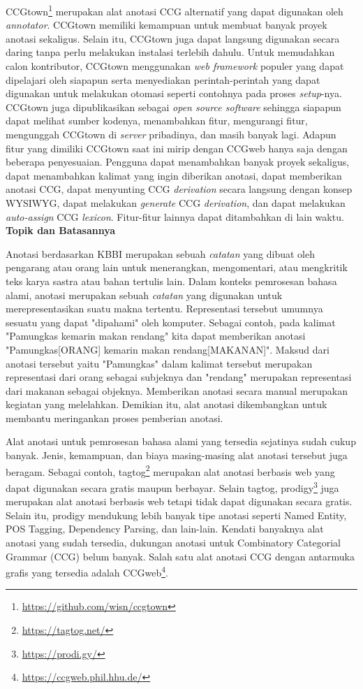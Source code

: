 CCGtown\footnote{\url{https://github.com/wisn/ccgtown}} merupakan alat anotasi CCG alternatif yang
dapat digunakan oleh \textit{annotator}. CCGtown memiliki kemampuan untuk membuat banyak proyek
anotasi sekaligus. Selain itu, CCGtown juga dapat langsung digunakan secara daring tanpa perlu
melakukan instalasi terlebih dahulu. Untuk memudahkan calon kontributor, CCGtown menggunakan
\textit{web framework} populer yang dapat dipelajari oleh siapapun serta menyediakan
perintah-perintah yang dapat digunakan untuk melakukan otomasi seperti contohnya pada proses
\textit{setup}-nya. CCGtown juga dipublikasikan sebagai \textit{open source software} sehingga
siapapun dapat melihat sumber kodenya, menambahkan fitur, mengurangi fitur, mengunggah CCGtown di
\textit{server} pribadinya, dan masih banyak lagi. Adapun fitur yang dimiliki CCGtown saat ini
mirip dengan CCGweb hanya saja dengan beberapa penyesuaian. Pengguna dapat menambahkan banyak
proyek sekaligus, dapat menambahkan kalimat yang ingin diberikan anotasi, dapat memberikan anotasi
CCG, dapat menyunting CCG \textit{derivation} secara langsung dengan konsep WYSIWYG, dapat
melakukan \textit{generate} CCG \textit{derivation}, dan dapat melakukan \textit{auto-assign} CCG
\textit{lexicon}. Fitur-fitur lainnya dapat ditambahkan di lain waktu.
\\


\noindent\textbf{Topik dan Batasannya}

Anotasi berdasarkan KBBI merupakan sebuah \textit{catatan} yang dibuat oleh pengarang atau
orang lain untuk menerangkan, mengomentari, atau mengkritik teks karya sastra atau
bahan tertulis lain. Dalam konteks pemrosesan bahasa alami, anotasi merupakan sebuah
\textit{catatan} yang digunakan untuk merepresentasikan suatu makna tertentu.
Representasi tersebut umumnya sesuatu yang dapat "dipahami" oleh komputer.
Sebagai contoh, pada kalimat "Pamungkas kemarin makan rendang" kita dapat memberikan anotasi
"Pamungkas[ORANG] kemarin makan rendang[MAKANAN]". Maksud dari anotasi tersebut yaitu "Pamungkas"
dalam kalimat tersebut merupakan representasi dari orang sebagai subjeknya dan "rendang"
merupakan representasi dari makanan sebagai objeknya. Memberikan anotasi secara manual merupakan
kegiatan yang melelahkan. Demikian itu, alat anotasi dikembangkan untuk membantu meringankan
proses pemberian anotasi.

Alat anotasi untuk pemrosesan bahasa alami yang tersedia sejatinya sudah cukup banyak.
Jenis, kemampuan, dan biaya masing-masing alat anotasi tersebut juga beragam. Sebagai contoh,
tagtog\footnote{\url{https://tagtog.net/}} merupakan alat anotasi berbasis web yang dapat digunakan
secara gratis maupun berbayar. Selain tagtog, prodigy\footnote{\url{https://prodi.gy/}} juga
merupakan alat anotasi berbasis web tetapi tidak dapat digunakan secara gratis. Selain itu, prodigy
mendukung lebih banyak tipe anotasi seperti Named Entity, POS Tagging, Dependency Parsing,
dan lain-lain. Kendati banyaknya alat anotasi yang sudah tersedia, dukungan anotasi untuk
Combinatory Categorial Grammar (CCG) belum banyak. Salah satu alat anotasi CCG dengan antarmuka
grafis yang tersedia adalah CCGweb\footnote{\url{https://ccgweb.phil.hhu.de/}}.


